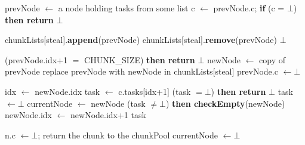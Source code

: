 \begin{algo}[!ht]
\begin{minipage}[t]{0.48\textwidth}
\begin{distribalgo}[1]
	\STATE prevNode $\leftarrow$ a node holding tasks from some list 
	\STATE c $\leftarrow$ prevNode.c; {\bf if} (c = $\bot$) {\bf then return} $\bot$

	\STATE chunkLists[steal].{\bf append}(prevNode) 
 		\STATE chunkLists[steal].{\bf remove}(prevNode)
 		 $\bot$ 
	\ENDINDENT

	\smallskip
	(prevNode.idx+1 $=$ CHUNK\_SIZE) {\bf then return} $\bot$
	\STATE newNode $\leftarrow$ copy of prevNode
	\STATE replace prevNode with newNode in chunkLists[steal]
	\STATE prevNode.c $\leftarrow \bot$ 
	
	\smallskip
	\STATE idx $\leftarrow$ newNode.idx
	\STATE task $\leftarrow$ c.tasks[idx+1] 
	 (task $= \bot$) {\bf then return} $\bot$ 
		\STATE task $\leftarrow \bot$
	\ENDINDENT
	\STATE currentNode $\leftarrow$ newNode
	 (task $\neq \bot$) {\bf then checkEmpty}(newNode)
	\STATE newNode.idx $\leftarrow$ newNode.idx+1
	 task
\ENDINDENT


\medskip

  	\STATE n.c $\leftarrow \bot$; return the chunk to the chunkPool
  	\STATE currentNode $\leftarrow \bot$
  \ENDINDENT
\ENDINDENT

\setcounter{alg:non-fifo:lines}{\value{ALC@line}}
\end{distribalgo}
\end{minipage}
\end{algo}

